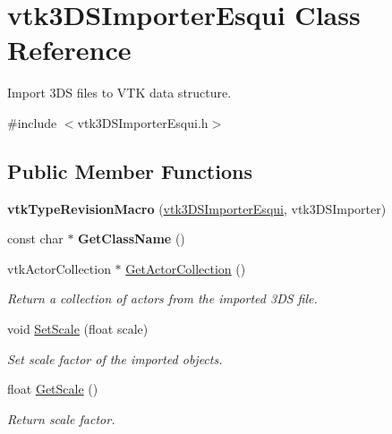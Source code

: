 \hypertarget{classvtk3DSImporterEsqui}{
\section{vtk3DSImporterEsqui Class Reference}
\label{classvtk3DSImporterEsqui}
}


Import 3DS files to VTK data structure.  


{\ttfamily \#include $<$vtk3DSImporterEsqui.h$>$}\subsection*{Public Member Functions}
\begin{DoxyCompactItemize}
\item 
\hypertarget{classvtk3DSImporterEsqui_a657b2bd3c6be6b0fb009801360017e1b}{
{\bfseries vtkTypeRevisionMacro} (\hyperlink{classvtk3DSImporterEsqui}{vtk3DSImporterEsqui}, vtk3DSImporter)}
\label{classvtk3DSImporterEsqui_a657b2bd3c6be6b0fb009801360017e1b}

\item 
\hypertarget{classvtk3DSImporterEsqui_a7eb8f26fda7f029ad225c15f7775447c}{
const char $\ast$ {\bfseries GetClassName} ()}
\label{classvtk3DSImporterEsqui_a7eb8f26fda7f029ad225c15f7775447c}

\item 
\hypertarget{classvtk3DSImporterEsqui_aea8b6e9f5ca12c2df69bdf51106e0caf}{
vtkActorCollection $\ast$ \hyperlink{classvtk3DSImporterEsqui_aea8b6e9f5ca12c2df69bdf51106e0caf}{GetActorCollection} ()}
\label{classvtk3DSImporterEsqui_aea8b6e9f5ca12c2df69bdf51106e0caf}

\begin{DoxyCompactList}\small\item\em Return a collection of actors from the imported 3DS file. \item\end{DoxyCompactList}\item 
void \hyperlink{classvtk3DSImporterEsqui_a79eed232c14247f4a9916c98ac5f5acc}{SetScale} (float scale)
\begin{DoxyCompactList}\small\item\em Set scale factor of the imported objects. \item\end{DoxyCompactList}\item 
float \hyperlink{classvtk3DSImporterEsqui_a3951ad4b8163e28825f7f9afdfcfa46c}{GetScale} ()
\begin{DoxyCompactList}\small\item\em Return scale factor. \item\end{DoxyCompactList}\end{DoxyCompactItemize}

